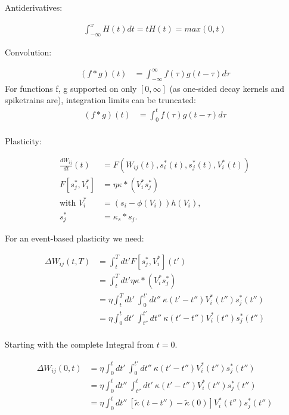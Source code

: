 Antiderivatives:

\begin{align}
  \int_{-\infty}^x H(t)dt = tH(t) = max(0,t)
\end{align}

Convolution:

\begin{align*}
  (f \ast g)(t) & = \int_{- \infty }^{\infty} f(\tau) g(t-\tau) d \tau
\end{align*}
For functions f, g supported on only $[0, \infty]$ (as one-sided decay kernels and spiketrains are), integration limits can be truncated:
\begin{align*}
  (f \ast g)(t) & = \int_{0}^{t} f(\tau) g(t-\tau) d \tau \\
\end{align*}


Plasticity:

\begin{align}
  \frac{dW_{ij}}{dt}(t) & = F(W_{ij}(t), s_i^\ast (t), s_j^\ast (t), V_i^\ast (t)) \\
  F[s_j^\ast, V_i^\ast] & = \eta \kappa \ast (V_i^\ast s_j^\ast)                   \\
  \text{with } V_i^\ast & = (s_i - \phi(V_i )) h(V_i),                             \\
  s_j^\ast              & = \kappa_s \ast s_j.
\end{align}

For an event-based plasticity we need:

\begin{align}
  \Delta W_{ij}(t,T) & = \int_t^T dt' F[s_j^\ast , V_i^\ast ](t')                                                 \\
                     & = \int_t^T dt' \eta \kappa \ast (V_i^\ast s_j^\ast)                                        \\
                     & = \eta \int_t^T dt' \  \int_0^{t'} dt'' \ \kappa(t'-t'') V_i^\ast (t'') s_j^\ast (t'')     \\
                     & = \eta \int_0^t dt' \  \int_{t''}^{t'} dt'' \ \kappa(t'-t'') V_i^\ast (t'') s_j^\ast (t'') \\
\end{align}


Starting with the complete Integral from $t=0$.

\begin{align*}
  \Delta W_{ij}(0,t) & =\eta \int_0^t dt' \  \int_0^{t'} dt'' \ \kappa(t'-t'') V_i^\ast (t'') s_j^\ast (t'')                          \\
                     & = \eta \int_0^t dt'' \  \int_{t''}^{t} dt' \ \kappa(t'-t'') V_i^\ast (t'') s_j^\ast (t'')                      \\
                     & = \eta \int_0^t dt'' \  \left[ \tilde{\kappa}(t-t'') - \tilde{\kappa}(0) \right] V_i^\ast (t'') s_j^\ast (t'') \\
\end{align*}

